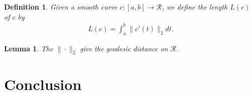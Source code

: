 \documentclass[a4paper,10pt]{amsart}
\newtheorem{definition}{Definition}[section]
\newtheorem{lemma}{Lemma}[section]
\newcommand{\RR}{\mathcal R}
\begin{document}
\begin{definition}
    Given a smooth curve $c: [a, b] \rightarrow \RR$, we define the 
    length $L(c)$ of $c$ by
    \begin{align*}
        L(c) = \int^{b}_{a} \|c'(t)\|_2 dt. 
    \end{align*}
\end{definition}

\begin{lemma}
   The $\| \cdot \|_2$ give the geodesic distance on $\RR$. 
\end{lemma}

\section{Conclusion}


\end{document}
